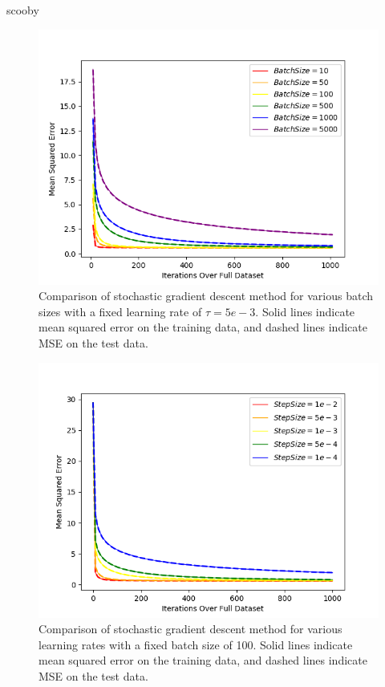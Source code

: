 \documentclass{article}
\begin{document}
scooby


\begin{figure}[h!]
\centerline{
\includegraphics[width= 18cm]{img/problem_2/batch_comparison.png}
}
\caption{\label{fig:fig2}Comparison of stochastic gradient descent method for various batch sizes with a fixed learning rate of $\tau = 5e-3$. Solid lines indicate mean squared error on the training data, and dashed lines indicate MSE on the test data.}
\end{figure}

\begin{figure}[h!]
\centerline{
\includegraphics[width= 18cm]{img/problem_2/step_comparison.png}
}
\caption{\label{fig:fig3}Comparison of stochastic gradient descent method for various learning rates with a fixed batch size of 100. Solid lines indicate mean squared error on the training data, and dashed lines indicate MSE on the test data.}
\end{figure}
\end{document}
